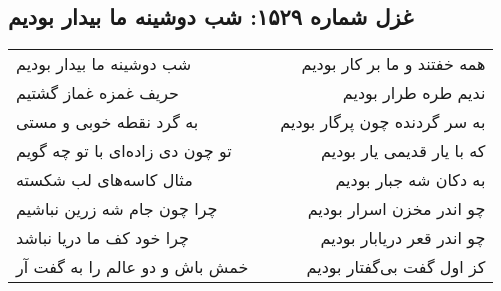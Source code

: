 \begin{center}
\section*{غزل شماره ۱۵۲۹: شب دوشینه ما بیدار بودیم}
\label{sec:1529}
\begin{longtable}{l p{0.5cm} r}
شب دوشینه ما بیدار بودیم
&&
همه خفتند و ما بر کار بودیم
\\
حریف غمزه غماز گشتیم
&&
ندیم طره طرار بودیم
\\
به گرد نقطه خوبی و مستی
&&
به سر گردنده چون پرگار بودیم
\\
تو چون دی زاده‌ای با تو چه گویم
&&
که با یار قدیمی یار بودیم
\\
مثال کاسه‌های لب شکسته
&&
به دکان شه جبار بودیم
\\
چرا چون جام شه زرین نباشیم
&&
چو اندر مخزن اسرار بودیم
\\
چرا خود کف ما دریا نباشد
&&
چو اندر قعر دریابار بودیم
\\
خمش باش و دو عالم را به گفت آر
&&
کز اول گفت بی‌گفتار بودیم
\\
\end{longtable}
\end{center}
